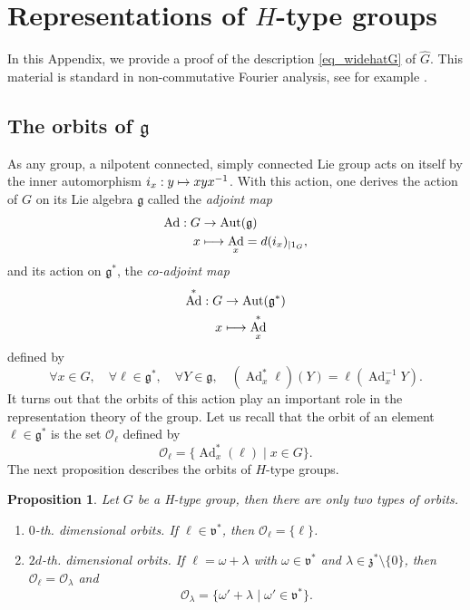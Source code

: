 \documentclass[JEP,XML,SOM,Unicode,published]{cedram}
\let\mathcal\mathscr
\newcommand\mto{\mathchoice{\longmapsto}{\mapsto}{\mapsto}{\mapsto}}
\let\sep\mid
\DeclareMathOperator{\Ad}{Ad}
\DeclareMathOperator{\Aut}{Aut}
\theoremstyle{plain}
\newtheorem{proposition}[theorem]{Proposition}
\theoremstyle{definition}
\begin{document}
\appendix

\section{Representations of \texorpdfstring{$H$}{H}-type groups} \label{a:rep}
In this Appendix, we provide a proof of the description \eqref{eq_widehatG} of $\widehat{G}$. This material is standard in non-commutative Fourier analysis, see for example \cite{CG}.

\subsection{The orbits of $\mathfrak g$}
As any group, a nilpotent connected, simply connected Lie group acts on itself by the inner automorphism $i_x: y\mto xyx^{-1}$. With this action, one derives the action of
$G$ on its Lie algebra $\mathfrak g$ called the \emph{adjoint map}
\begin{align*}
\Ad : G &\to \Aut (\mathfrak g)\\
x & \mto \Ad_x= d(i_x)_{| 1_G},
\end{align*}
and its action on $\mathfrak g^*$, the \emph{co-adjoint map}
\begin{align*}
\Ad^* : G &\to \Aut (\mathfrak g^*)\\
x & \mto \Ad^*_x
\end{align*}
defined by
\[
\forall x\in G, \quad \forall \ell \in \mathfrak g^*,\quad \forall Y\in \mathfrak g,\quad (\Ad^*_x \ell)(Y)=\ell(\Ad_x^{-1} Y).
\]
It turns out that the orbits of this action play an important role in the representation theory of the group.
Let us recall that the orbit of an element $\ell \in \mathfrak g^*$ is the set $\mathcal O_\ell$ defined by
\[
\mathcal O_\ell = \{ \Ad^*_x(\ell)\sep x\in G\}.
\]
The next proposition describes the orbits of $H$-type groups.

\begin{proposition}
Let $G$ be a H-type group, then there are only two types of orbits.
\begin{enumerate}
\item[(i)] $0$-th. dimensional orbits. If $\ell \in \mathfrak v^*$, then $\mathcal O_\ell = \{\ell\}$.
\item [(ii)] $2d$-th. dimensional orbits. If $\ell = \omega +\lambda$ with $\omega\in \mathfrak v^*$ and $\lambda\in\mathfrak z^*\setminus\{0\}$, then $\mathcal O_\ell =\mathcal O_\lambda$ and
\[
\mathcal O_\lambda = \{ \omega' + \lambda\sep \omega'\in \mathfrak v^*\}.
\]
\end{enumerate}
\end{proposition}
\end{document}
